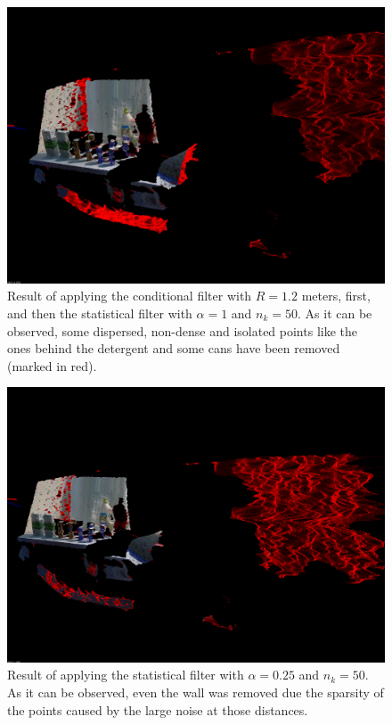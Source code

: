 \documentclass[../main.tex]{subfiles}
\begin{document}
\begin{figure}[htbp]
    \centering
    \includegraphics[width=1\textwidth]{images/conditional_stat_filter_testbench.png}
    \caption{Result of applying the conditional filter with $R=1.2$ meters, first, and then the statistical filter with $\alpha=1$ and $n_{k}=50$. As it can be observed, some dispersed, non-dense and isolated points like the ones behind the detergent and some cans have been removed (marked in red).}
    \label{fig:conditional_stat_filter_testbench}
\end{figure}

\begin{figure}[htbp]
    \centering
    \includegraphics[width=1\textwidth]{images/stat_filter025std.png}
    \caption{Result of applying the statistical filter with $\alpha=0.25$ and $n_{k}=50$. As it can be observed, even the wall was removed due the sparsity of the points caused by the large noise at those distances.}
    \label{fig:stat_filter025std}
\end{figure}
\end{document}
